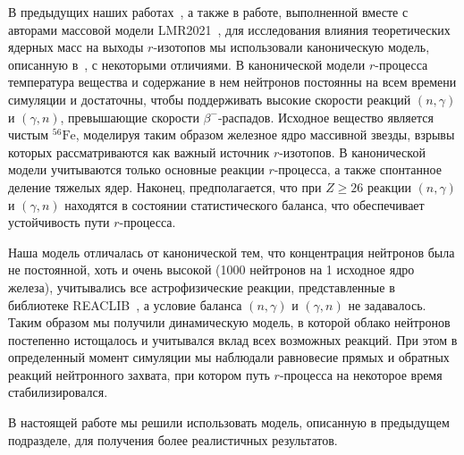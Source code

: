 В предыдущих наших работах~\cite{my-vestnik2021,my-iran2022,my-pos2022}, а также в работе, выполненной вместе с авторами массовой модели LMR2021~\cite{vladimirova2022}, для исследования влияния теоретических ядерных масс на выходы $r$-изотопов мы использовали каноническую модель, описанную в~\cite{arnould2007}, с некоторыми отличиями. В канонической модели $r$-процесса температура вещества и содержание в нем нейтронов постоянны на всем времени симуляции и достаточны, чтобы поддерживать высокие скорости реакций $(n,\gamma)$ и $(\gamma,n)$, превышающие скорости $\beta^-$-распадов. Исходное вещество является чистым ${}^{56}\text{Fe}$, моделируя таким образом железное ядро массивной звезды, взрывы которых рассматриваются как важный источник $r$-изотопов. В канонической модели учитываются только основные реакции $r$-процесса, а также спонтанное деление тяжелых ядер. Наконец, предполагается, что при $Z \geq 26$ реакции $(n,\gamma)$ и $(\gamma,n)$ находятся в состоянии статистического баланса, что обеспечивает устойчивость пути $r$-процесса.

Наша модель отличалась от канонической тем, что концентрация нейтронов была не постоянной, хоть и очень высокой (1000 нейтронов на 1 исходное ядро железа), учитывались все астрофизические реакции, представленные в библиотеке REACLIB~\cite{reaclib2010}, а условие баланса $(n,\gamma)$ и $(\gamma,n)$ не задавалось. Таким образом мы получили динамическую модель, в которой облако нейтронов постепенно истощалось и учитывался вклад всех возможных реакций. При этом в определенный момент симуляции мы наблюдали равновесие прямых и обратных реакций нейтронного захвата, при котором путь $r$-процесса на некоторое время стабилизировался.

В настоящей работе мы решили использовать модель, описанную в предыдущем подразделе, для получения более реалистичных результатов.

